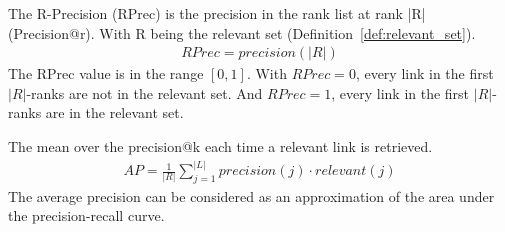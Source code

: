 \begin{definition}
  The R-Precision (RPrec) is the precision in the rank list at rank |R| (Precision@r).
  With R being the relevant set (Definition~\ref{def:relevant_set}).
  \begin{gather*}
    RPrec = precision(|R|)
  \end{gather*}
  The RPrec value is in the range $\left[0, 1\right]$.
  With $RPrec=0$, every link in the first $|R|$-ranks are not in the relevant set.
  And $RPrec=1$, every link in the first $|R|$-ranks are in the relevant set.
\end{definition}

\begin{definition}
  The mean over the precision@k each time a relevant link is retrieved.
  \begin{gather*}
    AP = \frac{1}{|R|} \sum_{j=1}^{|L|} precision(j) \cdot relevant(j)
  \end{gather*}
  The average precision can be considered as an approximation of the area under the precision-recall curve.
\end{definition}

